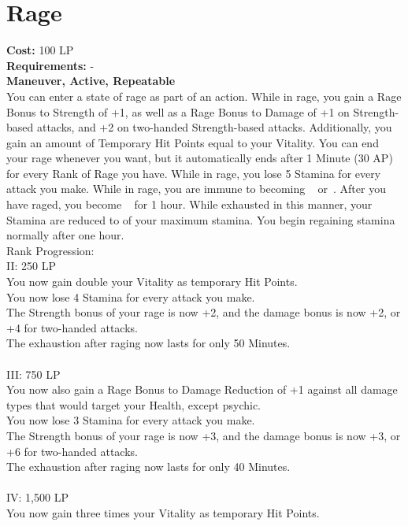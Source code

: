 \section{Rage}\label{perk:rage}
\textbf{Cost:} 100 LP\\
\textbf{Requirements:} -\\
\textbf{Maneuver, Active, Repeatable}\\
You can enter a state of rage as part of an action.
While in rage, you gain a Rage Bonus to Strength of +1, as well as a Rage Bonus to Damage of +1 on Strength-based attacks, and +2 on two-handed Strength-based attacks.
Additionally, you gain an amount of Temporary Hit Points equal to your Vitality.
You can end your rage whenever you want, but it automatically ends after 1 Minute (30 AP) for every Rank of Rage you have.
While in rage, you lose 5 Stamina for every attack you make.
While in rage, you are immune to becoming ~ or~.
After you have raged, you become ~
for 1 hour.
While exhausted in this manner, your Stamina are reduced to  of your maximum stamina.
You begin regaining stamina normally after one hour.
\\
Rank Progression:\\
II: 250 LP\\
You now gain double your Vitality as temporary Hit Points.\\
You now lose 4 Stamina for every attack you make.\\
The Strength bonus of your rage is now +2, and the damage bonus is now +2, or +4 for two-handed attacks.\\
The exhaustion after raging now lasts for only 50 Minutes.\\
\\
III: 750 LP\\
You now also gain a Rage Bonus to Damage Reduction of +1 against all damage types that would target your Health, except psychic.\\
You now lose 3 Stamina for every attack you make.\\
The Strength bonus of your rage is now +3, and the damage bonus is now +3, or +6 for two-handed attacks.\\
The exhaustion after raging now lasts for only 40 Minutes.\\
\\
IV: 1,500 LP\\
You now gain three times your Vitality as temporary Hit Points.\\
